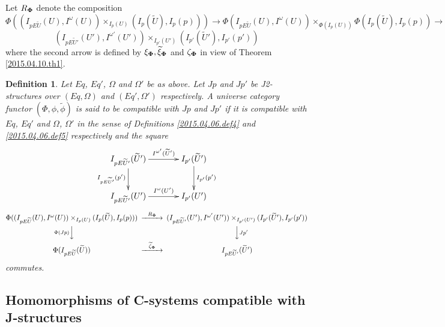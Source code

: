 \documentclass[12pt]{article}
\numberwithin{equation}{section}
\newtheorem{definition}[proposition]{Definition}
\newcommand{\llabel}[1]{\label{#1}}
\newcommand{\sr}{\rightarrow}
\newcommand{\wt}{\widetilde}
\begin{document}
%
Let $R_{\bf\Phi}$ denote the composition
%
$$\Phi((I_{pE\wt{U}}(U), I^{\omega}(U))\times_{I_p(U)} (I_p(\wt{U}),
I_p(p)))\sr \Phi(I_{pE\wt{U}}(U),
I^{\omega}(U))\times_{\Phi(I_p(U))}\Phi(I_p(\wt{U}), I_p(p))\sr$$
$$(I_{pE\wt{U}'}(U'),I^{\omega'}(U'))\times_{I_{p'}(U')}(I_{p'}(\wt{U}'),I_{p'}(p'))$$
%
where the second arrow is defined by $\xi_{\bf\Phi}, \wt{\xi}_{\bf\Phi}$ and
$\zeta_{\bf\Phi}$ in view of Theorem \ref{2015.04.10.th1}.
%
\begin{definition}
\llabel{2015.04.06.def6} Let $Eq$, $Eq'$, $\Omega$ and $\Omega'$ be as
above. Let $Jp$ and $Jp'$ be J2-structures over $(Eq,\Omega)$ and
$(Eq',\Omega')$ respectively.  A universe category functor
$(\Phi,\phi,\wt{\phi})$ is said to be compatible with $Jp$ and $Jp'$ if it is
compatible with $Eq$, $Eq'$ and $\Omega$, $\Omega'$ in the sense of Definitions
\ref{2015.04.06.def4} and \ref{2015.04.06.def5} respectively and the square
%
$$
\begin{xy}
          \xymatrix@C=3pc{ I_{pE\wt{U}'}(\wt{U}')
            \ar[r]^-{I^{\omega'}(\wt{U}')} \ar[d]_-{I_{pE\wt{U}'}(p')} &
            I_{p'}(\wt{U}')\ar[d]^-{I_{p'}(p')}\\ I_{pE\wt{U}'}(U')
            \ar[r]^-{I^{\omega}(U')} & I_{p'}(U') }
\end{xy}
$$
$$
\begin{CD}
\Phi((I_{pE\wt{U}}(U), I^{\omega}(U))\times_{I_p(U)} (I_p(\wt{U}), I_p(p)))
@>R_{\bf\Phi}>>
(I_{pE\wt{U}'}(U'),I^{\omega'}(U'))\times_{I_{p'}(U')}(I_{p'}(\wt{U}'),I_{p'}(p'))\\ @V\Phi(Jp)
VV @VVJp' V\\ \Phi(I_{pE\wt{U}}(\wt{U})) @>\wt{\zeta}_{\bf\Phi}>>
I_{pE\wt{U}'}(\wt{U}')
\end{CD}
$$
%
commutes.
\end{definition}













\subsection{Homomorphisms of C-systems compatible with J-structures}
%
\end{document}
